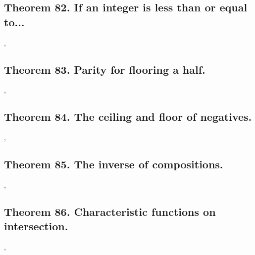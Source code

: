 \documentclass[preview]{standalone}
\begin{document}
\subsection[If an integer is less than or equal to...]
    {
        \color{section}Theorem 82. \color{black} If an integer is less than or equal to...
    }

\sep
\pagebreak


\subsection[Parity for flooring a half.]
    {
        \color{section}Theorem 83. \color{black} Parity for flooring a half.
    }

\sep
\pagebreak


\subsection[The ceiling and floor of negative numbers.]
    {
        \color{section}Theorem 84. \color{black} The ceiling and floor of negatives.
    }

\sep
\pagebreak


\subsection[The inverse of compositions.]
    {
        \color{section}Theorem 85. \color{black} The inverse of compositions.
    }

\sep
\pagebreak


\subsection[Characteristic functions on intersection.]
    {
        \color{section}Theorem 86. \color{black} Characteristic functions on intersection.
    }

\sep
\pagebreak



\end{document}
